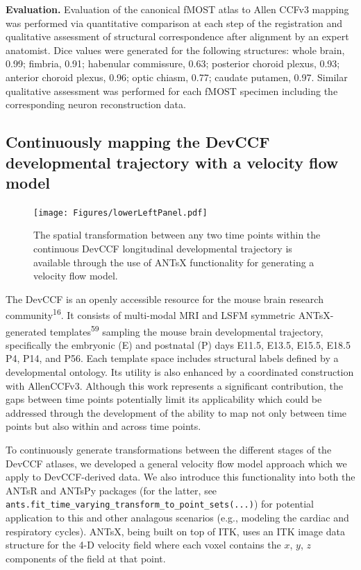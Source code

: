 \documentclass[
  12pt,
]{article}
\begin{document}
\textbf{Evaluation.} Evaluation of the canonical fMOST atlas to Allen
CCFv3 mapping was performed via quantitative comparison at each step of
the registration and qualitative assessment of structural correspondence
after alignment by an expert anatomist. Dice values were generated for
the following structures: whole brain, 0.99; fimbria, 0.91; habenular
commissure, 0.63; posterior choroid plexus, 0.93; anterior choroid
plexus, 0.96; optic chiasm, 0.77; caudate putamen, 0.97. Similar
qualitative assessment was performed for each fMOST specimen including
the corresponding neuron reconstruction data.

\subsection{Continuously mapping the DevCCF developmental trajectory
with a velocity flow
model}\label{continuously-mapping-the-devccf-developmental-trajectory-with-a-velocity-flow-model-1}

\begin{figure}
\centering
\texttt{[image: Figures/lowerLeftPanel.pdf]}
\caption{The spatial transformation between any two time points within the
continuous DevCCF longitudinal developmental trajectory is available through the
use of ANTsX functionality for generating a velocity flow model.}
\label{fig:devccfvelocity}
\end{figure}

The DevCCF is an openly accessible resource for the mouse brain research
community\textsuperscript{16}. It consists of multi-modal MRI and LSFM
symmetric ANTsX-generated templates\textsuperscript{59} sampling the
mouse brain developmental trajectory, specifically the embryonic (E) and
postnatal (P) days E11.5, E13.5, E15.5, E18.5 P4, P14, and P56. Each
template space includes structural labels defined by a developmental
ontology. Its utility is also enhanced by a coordinated construction
with AllenCCFv3. Although this work represents a significant
contribution, the gaps between time points potentially limit its
applicability which could be addressed through the development of the
ability to map not only between time points but also within and across
time points.

To continuously generate transformations between the different stages of
the DevCCF atlases, we developed a general velocity flow model approach
which we apply to DevCCF-derived data. We also introduce this
functionality into both the ANTsR and ANTsPy packages (for the latter,
see \texttt{ants.fit\_time\_varying\_transform\_to\_point\_sets(...)})
for potential application to this and other analagous scenarios (e.g.,
modeling the cardiac and respiratory cycles). ANTsX, being built on top
of ITK, uses an ITK image data structure for the 4-D velocity field
where each voxel contains the \(x\), \(y\), \(z\) components of the
field at that point.
\end{document}
